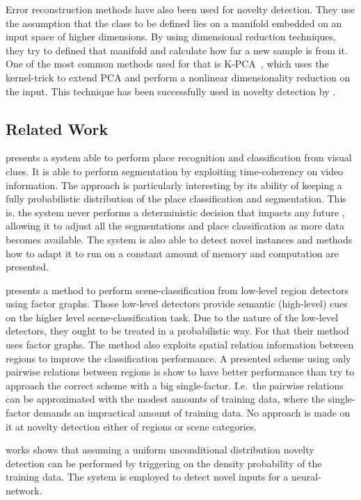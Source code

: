Error reconstruction methods have also been used for novelty detection.
They use the assumption that the class to be defined lies on a manifold embedded
on an input space of higher dimensions. By using dimensional reduction
techniques, they try to defined that manifold and calculate how far a new sample
is from it.
One of the most common methods used for that is
\gls{K-PCA}~\cite{scholkopf1997kernel}, which uses the kernel-trick to extend
\gls{PCA} and perform a nonlinear dimensionality reduction on the input.
This technique has been successfully used in novelty detection by
\cite{Hoffmann2007863}.

\subsection{Related Work}
\cite{ranganathan2010pliss} presents a system able to perform place recognition
and classification from visual clues. It is able to perform segmentation by
exploiting time-coherency on video information. The approach is particularly
interesting by its ability of keeping a fully probabilistic distribution of
the place classification and segmentation. This is, the system never performs
a deterministic decision that impacts any future , allowing it to adjust all
the segmentations and place classification as more data becomes available.
The system is also able to detect novel instances and methods how to adapt it
to run on a constant amount of memory and computation are presented.


\cite{boutell2006factor} presents a method to perform scene-classification
from low-level region detectors using factor graphs. Those low-level detectors
provide semantic (high-level) cues on the higher level scene-classification
task. Due to the nature of the low-level detectors, they ought to be treated
in a probabilistic way. For that their method uses factor graphs. The method
also exploits spatial relation information between regions to improve the
classification performance. A presented scheme using only pairwise relations
between regions is show to have better performance than try to approach the
correct scheme with a big single-factor. I.e.\ the pairwise relations can be
approximated with the modest amounts of training data, where the single-factor
demands an impractical amount of training data.
No approach is made on it at novelty detection either of regions or scene
categories. 

\cite{bishop1994novelty} works shows that assuming a uniform unconditional
distribution novelty detection can be performed by triggering on the
density probability of the training data. The system is employed to detect novel
inputs for a neural-network.

